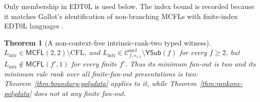 \documentclass[11pt]{article}
\numberwithin{equation}{section}
\theoremstyle{plain}
\newtheorem{theorem}{Theorem}[section]
\theoremstyle{definition}
\theoremstyle{remark}
\newcommand{\Cmcf}[2]{\mathcal{C}^{\mathrm{mcf}}_{#1,#2}}
\newcommand{\YSub}[1]{\mathsf{YSub}(#1)}
\theoremstyle{plain}
\begin{document}
Only membership in EDT0L is used below.  The index bound is recorded because it
matches Gallot's identification of non-branching MCFLs with finite-index EDT0L
languages \cite[Theorem~29]{Gallot2021}.

\begin{theorem}[A non-context-free intrinsic-rank-two typed witness]
\label{thm:intrinsic-ranktwo-witness}
$L_{\mathrm{intr}}\in\mathsf{MCFL}(2,2)\setminus\mathrm{CFL}$, and
$L_{\mathrm{intr}}\in\Cmcf{f}{s_{1,1}}\setminus\YSub{f}$ for every $f\ge2$, but
$L_{\mathrm{intr}}\notin\mathsf{MCFL}(f',1)$ for every finite $f'$.  Thus its minimum
fan-out is two and its minimum rule rank over all finite-fan-out presentations is
two: Theorem~\ref{thm:boundary-polydata} applies to it, while
Theorem~\ref{thm:rankone-polydata} does not at any finite fan-out.
\end{theorem}
\end{document}
